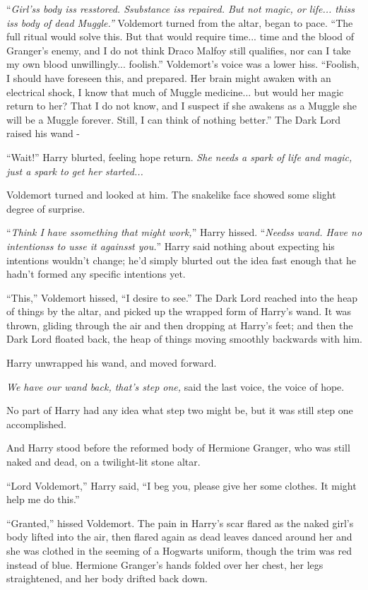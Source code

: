 ``\emph{Girl'ss body iss resstored. Ssubstance iss repaired. But not magic, or life... thiss iss body of dead Muggle.''} Voldemort turned from the altar, began to pace. ``The full ritual would solve this. But that would require time... time and the blood of Granger's enemy, and I do not think Draco Malfoy still qualifies, nor can I take my own blood unwillingly... foolish.'' Voldemort's voice was a lower hiss. ``Foolish, I should have foreseen this, and prepared. Her brain might awaken with an electrical shock, I know that much of Muggle medicine... but would her magic return to her? That I do not know, and I suspect if she awakens as a Muggle she will be a Muggle forever. Still, I can think of nothing better.'' The Dark Lord raised his wand -

``Wait!'' Harry blurted, feeling hope return. \emph{She needs a spark of life and magic, just a spark to get her started...}

Voldemort turned and looked at him. The snakelike face showed some slight degree of surprise.

``\emph{Think I have ssomething that might work,}'' Harry hissed. ``\emph{Needss wand. Have no intentionss to usse it againsst you.}'' Harry said nothing about expecting his intentions wouldn't change; he'd simply blurted out the idea fast enough that he hadn't formed any specific intentions yet.

``This,'' Voldemort hissed, ``I desire to see.'' The Dark Lord reached into the heap of things by the altar, and picked up the wrapped form of Harry's wand. It was thrown, gliding through the air and then dropping at Harry's feet; and then the Dark Lord floated back, the heap of things moving smoothly backwards with him.

Harry unwrapped his wand, and moved forward.

\emph{We have our wand back, that's step one,} said the last voice, the voice of hope.

No part of Harry had any idea what step two might be, but it was still step one accomplished.

And Harry stood before the reformed body of Hermione Granger, who was still naked and dead, on a twilight-lit stone altar.

``Lord Voldemort,'' Harry said, ``I beg you, please give her some clothes. It might help me do this.''

``Granted,'' hissed Voldemort. The pain in Harry's scar flared as the naked girl's body lifted into the air, then flared again as dead leaves danced around her and she was clothed in the seeming of a Hogwarts uniform, though the trim was red instead of blue. Hermione Granger's hands folded over her chest, her legs straightened, and her body drifted back down.

